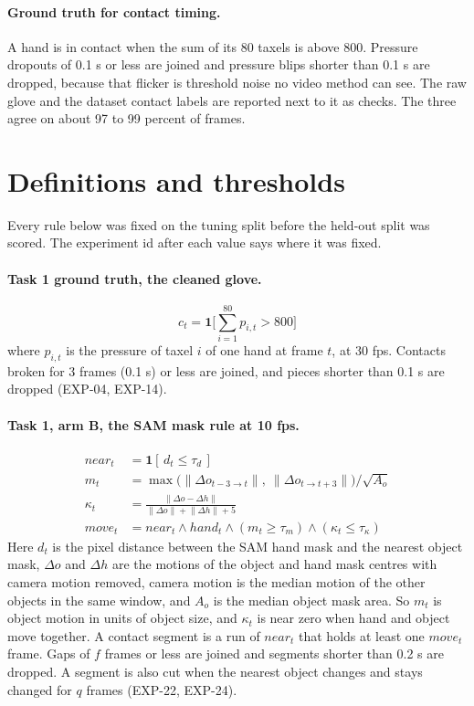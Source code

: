 \documentclass[10pt,twocolumn,letterpaper]{article}
\begin{document}
\paragraph{Ground truth for contact timing.} A hand is in contact when the sum
of its 80 taxels is above 800. Pressure dropouts of 0.1 s or less are joined
and pressure blips shorter than 0.1 s are dropped, because that flicker is
threshold noise no video method can see. The raw glove and the dataset contact
labels are reported next to it as checks. The three agree on about 97 to 99
percent of frames.

\section{Definitions and thresholds}
\label{sec:defs}

Every rule below was fixed on the tuning split before the held-out split was
scored. The experiment id after each value says where it was fixed.

\paragraph{Task 1 ground truth, the cleaned glove.}
\begin{equation}
c_t = \mathbf{1}\Big[ \textstyle\sum_{i=1}^{80} p_{i,t} > 800 \Big]
\end{equation}
where $p_{i,t}$ is the pressure of taxel $i$ of one hand at frame $t$, at
30 fps. Contacts broken for 3 frames (0.1 s) or less are joined, and pieces
shorter than 0.1 s are dropped (EXP-04, EXP-14).

\paragraph{Task 1, arm B, the SAM mask rule at 10 fps.}
\begin{align}
\mathit{near}_t &= \mathbf{1}[\, d_t \le \tau_d \,]\\
m_t &= \max\big(\lVert \Delta o_{t-3 \to t} \rVert,\
      \lVert \Delta o_{t \to t+3} \rVert\big) / \sqrt{A_o}\\
\kappa_t &= \frac{\lVert \Delta o - \Delta h \rVert}
                 {\lVert \Delta o \rVert + \lVert \Delta h \rVert + 5}\\
\mathit{move}_t &= \mathit{near}_t \wedge \mathit{hand}_t \wedge
      (m_t \ge \tau_m) \wedge (\kappa_t \le \tau_\kappa)
\end{align}
Here $d_t$ is the pixel distance between the SAM hand mask and the nearest
object mask, $\Delta o$ and $\Delta h$ are the motions of the object and hand
mask centres with camera motion removed, camera motion is the median motion of
the other objects in the same window, and $A_o$ is the median object mask area.
So $m_t$ is object motion in units of object size, and $\kappa_t$ is near zero
when hand and object move together. A contact segment is a run of
$\mathit{near}_t$ that holds at least one $\mathit{move}_t$ frame. Gaps of $f$
frames or less are joined and segments shorter than 0.2 s are dropped. A
segment is also cut when the nearest object changes and stays changed for $q$
frames (EXP-22, EXP-24).
\end{document}
